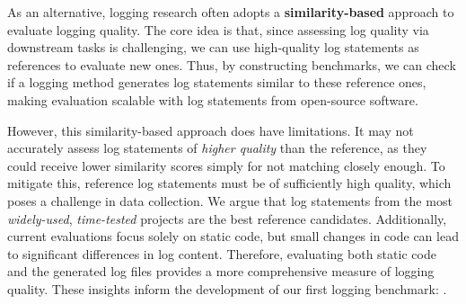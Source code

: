 As an alternative, logging research often adopts a \textbf{similarity-based} approach to evaluate logging quality.
The core idea is that, since assessing log quality via downstream tasks is challenging, we can use high-quality log statements as references to evaluate new ones.
Thus, by constructing benchmarks, we can check if a logging method generates log statements similar to these reference ones, making evaluation scalable with log statements from open-source software.

However, this similarity-based approach does have limitations.
It may not accurately assess log statements of \textit{higher quality} than the reference, as they could receive lower similarity scores simply for not matching closely enough. To mitigate this, reference log statements must be of sufficiently high quality, which poses a challenge in data collection. We argue that log statements from the most \textit{widely-used}, \textit{time-tested} projects are the best reference candidates. Additionally, current evaluations focus solely on static code, but small changes in code can lead to significant differences in log content. Therefore, evaluating both static code and the generated log files provides a more comprehensive measure of logging quality. These insights inform the development of our first logging benchmark: \methodname.